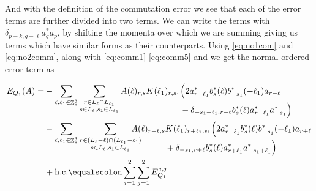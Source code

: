 \documentclass[sn-mathphys, Numbered ,a4paper]{sn-jnl}%
\DeclareMathOperator{\Z}{\mathbb{Z}}
\theoremstyle{plain}
\theoremstyle{definition}
\theoremstyle{remark}
\theoremstyle{plain}
\theoremstyle{definition}
\theoremstyle{remark}
\begin{document}
And with the definition of the commutation error we see that each of the error terms are further divided into two terms. We can write the terms with $\delta_{p-k,q-\ell}a^*_{q}a_{p}$, by shifting the momenta over which we are summing giving us terms which have similar forms as their counterparts. Using \eqref{eq:no1com} and \eqref{eq:no2comm}, along with \eqref{eq:comm1}-\eqref{eq:comm5} and we get the normal ordered error term as
\begin{comment}
\begin{alignat}{2}
	E_{Q_1}(A) &= -
	\sum\limits_{\ell, \ell_1\in \Z^3_*}\sum\limits_{\substack{r\in L_{\ell} \cap L_{\ell_1}\\ s \in L_{\ell},s_1\in L_{\ell_1}}} A(\ell)_{r,s}K(\ell_1)_{r,s_1}
	\begin{aligned}[t]
		&\Big( 2a^*_{r-\ell_1}b^*_{s}(\ell) b^*_{-s_1}(-\ell_1)a_{r-\ell} \\ &+ b^*_{s}(\ell) a^*_{r-\ell_1}[b_{-s_1}(-\ell_1),a^*_{r-\ell}]^*+ \mathrm{h.c.} \Big)
	\end{aligned}\nonumber\\
	&\quad -\sum\limits_{\ell, \ell_1\in \Z^3_*}\sum\limits_{\substack{r\in (L_{\ell}-\ell) \cap (L_{\ell_1}-\ell_1)\\ s \in L_{\ell},s_1\in L_{\ell_1} }}\!\!\!\!\!\!\!\!\!\begin{aligned}[t] A(\ell)_{r+\ell,s}&K(\ell_1)_{r+\ell_1,s_1}
		\Big( 2a^*_{r+\ell_1}b^*_{s}(\ell) b^*_{-s_1}(-\ell_1) a_{r+\ell}\nonumber \\ &+ b^*_{s}(\ell) a^*_{r+\ell_1}[b_{-s_1}(-\ell_1),a^*_{r+\ell}]^*+ \mathrm{h.c.} \Big)
	\end{aligned}\\
\end{alignat}
\end{comment}
\begin{alignat}{2}
    E_{Q_1}(A) = &-
    \sum\limits_{\ell, \ell_1\in \Z^3_*}\sum\limits_{\substack{r\in L_{\ell} \cap L_{\ell_1}\\ s \in L_{\ell},s_1\in L_{\ell_1}}} A(\ell)_{r,s}K(\ell_1)_{r,s_1}
    \begin{aligned}[t]
        &\Big( 2a^*_{r-\ell_1}b^*_{s}(\ell) b^*_{-s_1}(-\ell_1)a_{r-\ell} \\ & -\delta_{-s_1+\ell_1,r-\ell} b^*_{s}(\ell) a^*_{r-\ell_1}a^*_{-s_1}\Big)
    \end{aligned}\nonumber\\
    & -\sum\limits_{\ell, \ell_1\in \Z^3_*}\sum\limits_{\substack{r\in (L_{\ell}-\ell) \cap (L_{\ell_1}-\ell_1)\\ s \in L_{\ell},s_1\in L_{\ell_1} }}\!\!\!\!\!\!\!\!\!
    \begin{aligned}[t] A(\ell)_{r+\ell,s}&K(\ell_1)_{r+\ell_1,s_1}
    \Big( 2a^*_{r+\ell_1}b^*_{s}(\ell) b^*_{-s_1}(-\ell_1) a_{r+\ell}\nonumber \\ &+ \delta_{-s_1,r+\ell} b^*_{s}(\ell) a^*_{r+\ell_1}a^*_{-s_1+\ell_1}\Big)
    \end{aligned}\\
	&+ \mathrm{h.c.} \equalscolon \sum\limits_{i=1}^{2}\sum\limits_{j=1}^{2} E_{Q_1}^{\,i,j}\nonumber
\end{alignat}
\end{document}
